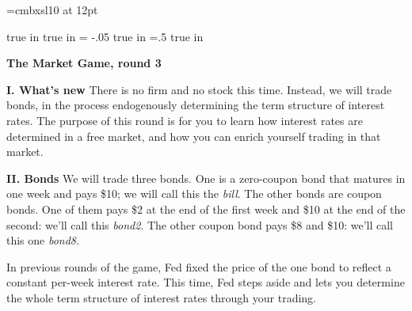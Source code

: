 \twelvepoint
\def\interline{12pt}
\font\bfsl=cmbxsl10 at 12pt

\newcount\notenumber
\def\clearnotenumber{\notenumber=0\relax}
\def\note#1{%
  \advance\notenumber by 1\baselineskip=12pt
  \footnote{$^{\the\notenumber}$}{{\tenpoint #1\vskip -12pt}}
  \baselineskip=\interline}
\clearnotenumber

\def\section#1{\vskip 4pt\noindent
  {\baselineskip 9pt\relax\bf#1}\vskip 0pt\noindent}
\def\subsection#1{\vskip 4pt\noindent
  {\baselineskip 9pt\relax\bfsl#1}\vskip 0pt\noindent}

\parskip=4pt
\baselineskip=\interline
{} true in
 true in\relax
\hoffset= -.05 true in
\voffset=.5 true in


\centerline{{\bf The Market Game, round 3}}

\section{I. What's new}%
There is no firm and no stock this time.  Instead, we will trade
bonds, in the process endogenously determining the term structure of
interest rates.  The purpose of this round is for you to learn how
interest rates are determined in a free market, and how you can
enrich yourself trading in that market.

\section{II. Bonds}%
We will trade three bonds.  One is a zero-coupon bond that matures in
one week and pays \$10; we will call this the {\it bill}.  The other
bonds are coupon bonds.  One of them pays \$2 at the end of the first
week and \$10 at the end of the second: we'll call this {\it bond2}.
The other coupon bond pays \$8 and \$10: we'll call this one {\it bond8}.

In previous rounds of the game, Fed fixed the price of the one bond to
reflect a constant per-week interest rate.  This time, Fed steps aside
and lets you determine the whole term structure of interest rates 
through your trading.
				   
